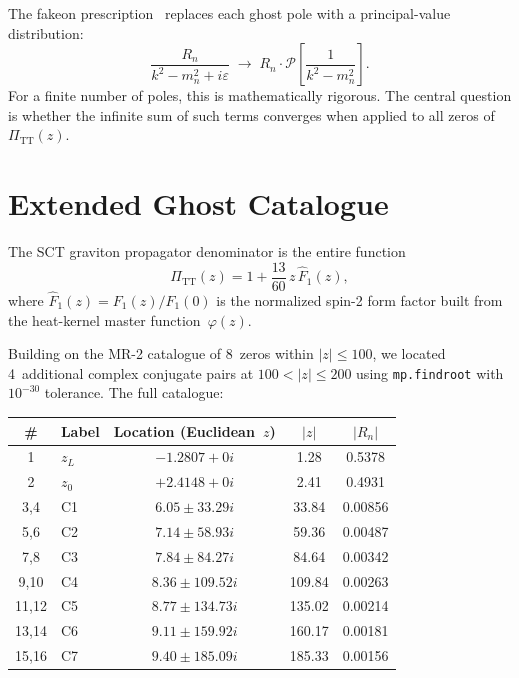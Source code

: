 \documentclass[11pt,a4paper]{article}
\newcommand{\PiTT}{\Pi_{\mathrm{TT}}}
\newcommand{\Fhat}{\hat{F}}
\newcommand{\PV}{\mathcal{P}}
\begin{document}
The fakeon prescription~\cite{AnselmiPiva2017} replaces each ghost pole
with a principal-value distribution:
\begin{equation}\label{eq:fakeon}
  \frac{R_n}{k^2 - m_n^2 + i\varepsilon}
  \;\longrightarrow\;
  R_n \cdot \PV\!\left[\frac{1}{k^2 - m_n^2}\right].
\end{equation}
For a finite number of poles, this is mathematically rigorous.  The
central question is whether the infinite sum of such terms converges
when applied to all zeros of~$\PiTT(z)$.


\section{Extended Ghost Catalogue}
\label{sec:catalogue}

The SCT graviton propagator denominator is the entire function
\begin{equation}\label{eq:PiTT}
  \PiTT(z) = 1 + \frac{13}{60}\,z\,\Fhat_1(z),
\end{equation}
where $\Fhat_1(z) = F_1(z)/F_1(0)$ is the normalized spin-2 form factor
built from the heat-kernel master function~$\varphi(z)$.

Building on the MR-2 catalogue of 8~zeros within $|z| \leq 100$, we
located 4~additional complex conjugate pairs at $100 < |z| \leq 200$
using \texttt{mp.findroot} with $10^{-30}$ tolerance.  The full
catalogue:

\begin{center}
\begin{tabular}{clccc}
\toprule
\# & Label & Location (Euclidean~$z$) & $|z|$ & $|R_n|$ \\
\midrule
1 & $z_L$ & $-1.2807 + 0i$ & 1.28 & 0.5378 \\
2 & $z_0$ & $+2.4148 + 0i$ & 2.41 & 0.4931 \\
3,4 & C1 & $6.05 \pm 33.29i$ & 33.84 & 0.00856 \\
5,6 & C2 & $7.14 \pm 58.93i$ & 59.36 & 0.00487 \\
7,8 & C3 & $7.84 \pm 84.27i$ & 84.64 & 0.00342 \\
9,10 & C4 & $8.36 \pm 109.52i$ & 109.84 & 0.00263 \\
11,12 & C5 & $8.77 \pm 134.73i$ & 135.02 & 0.00214 \\
13,14 & C6 & $9.11 \pm 159.92i$ & 160.17 & 0.00181 \\
15,16 & C7 & $9.40 \pm 185.09i$ & 185.33 & 0.00156 \\
\bottomrule
\end{tabular}
\end{center}
\end{document}
